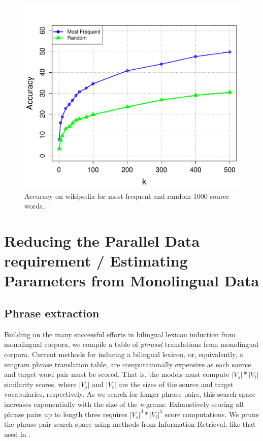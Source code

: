 \documentclass[11pt]{article}
\begin{document}
\begin{figure}[t]
\begin{center}
\centerline{\includegraphics[scale=0.45]{../figures/lexinduct/lexinduct.pdf}} %
\caption{Accuracy on wikipedia for most frequent and random 1000 source words. }
\label{fig:lexinduct}
\end{center}
\vskip -0.2in
\end{figure}
 

\section{Reducing the Parallel Data requirement / Estimating Parameters from Monolingual Data} \label{sect:mono}

\subsection{Phrase extraction}  \label{sect:extract}

Building on the many successful efforts in bilingual lexicon induction from monolingual corpora, we compile a table of {\it phrasal} translations from monolingual corpora. Current methods for inducing a bilingual lexicon, or, equivalently, a unigram phrase translation table, are computationally expensive as each source and target word pair must be scored. That is, the models must  compute $|V_s| * |V_t|$ similarity scores, where $|V_s|$ and $|V_t|$ are the sizes of the source and target vocabularies, respectively. As we search for longer phrase pairs, this search space increases exponentially with the size of the  {\it n}-grams. Exhaustively scoring all phrase pairs up to length three requires $|V_s|^3 * |V_t|^3 $ score computations. We prune the phrase pair search space using methods from Information Retrieval, like that used in . 
\end{document}

